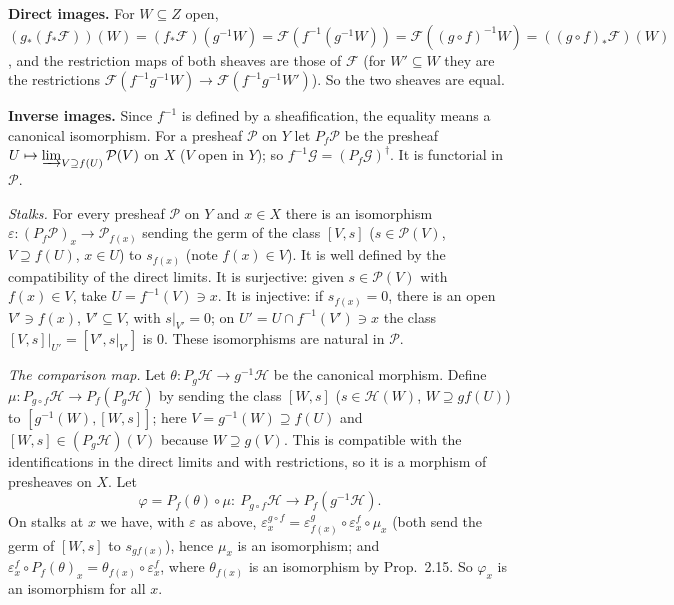 \documentclass[11pt]{article}
\begin{document}
\pf
\textbf{Direct images.} For $W\subseteq Z$ open, $(g_*(f_*\mathcal F))(W)=(f_*\mathcal F)(g^{-1}W)=\mathcal F(f^{-1}(g^{-1}W))=\mathcal F((g\circ f)^{-1}W)=((g\circ f)_*\mathcal F)(W)$, and the restriction maps of both sheaves are those of $\mathcal F$ (for $W'\subseteq W$ they are the restrictions $\mathcal F(f^{-1}g^{-1}W)\to\mathcal F(f^{-1}g^{-1}W')$). So the two sheaves are equal.

\textbf{Inverse images.} Since $f^{-1}$ is defined by a sheafification, the equality means a canonical isomorphism. For a presheaf $\mathcal P$ on $Y$ let $P_f\mathcal P$ be the presheaf $U\mapsto\varinjlim_{V\supseteq f(U)}\mathcal P(V)$ on $X$ ($V$ open in $Y$); so $f^{-1}\mathcal G=(P_f\mathcal G)^\dagger$. It is functorial in $\mathcal P$.

\emph{Stalks.} For every presheaf $\mathcal P$ on $Y$ and $x\in X$ there is an isomorphism $\varepsilon:(P_f\mathcal P)_x\to\mathcal P_{f(x)}$ sending the germ of the class $[V,s]$ ($s\in\mathcal P(V)$, $V\supseteq f(U)$, $x\in U$) to $s_{f(x)}$ (note $f(x)\in V$). It is well defined by the compatibility of the direct limits. It is surjective: given $s\in\mathcal P(V)$ with $f(x)\in V$, take $U=f^{-1}(V)\ni x$. It is injective: if $s_{f(x)}=0$, there is an open $V'\ni f(x)$, $V'\subseteq V$, with $s|_{V'}=0$; on $U'=U\cap f^{-1}(V')\ni x$ the class $[V,s]|_{U'}=[V',s|_{V'}]$ is $0$. These isomorphisms are natural in $\mathcal P$.

\emph{The comparison map.} Let $\theta:P_g\mathcal H\to g^{-1}\mathcal H$ be the canonical morphism. Define $\mu:P_{g\circ f}\mathcal H\to P_f(P_g\mathcal H)$ by sending the class $[W,s]$ ($s\in\mathcal H(W)$, $W\supseteq gf(U)$) to $[g^{-1}(W),[W,s]]$; here $V=g^{-1}(W)\supseteq f(U)$ and $[W,s]\in(P_g\mathcal H)(V)$ because $W\supseteq g(V)$. This is compatible with the identifications in the direct limits and with restrictions, so it is a morphism of presheaves on $X$. Let
\[ \varphi=P_f(\theta)\circ\mu:\ P_{g\circ f}\mathcal H\longrightarrow P_f(g^{-1}\mathcal H). \]
On stalks at $x$ we have, with $\varepsilon$ as above, $\varepsilon^{g\circ f}_x=\varepsilon^g_{f(x)}\circ\varepsilon^f_x\circ\mu_x$ (both send the germ of $[W,s]$ to $s_{gf(x)}$), hence $\mu_x$ is an isomorphism; and $\varepsilon^f_x\circ P_f(\theta)_x=\theta_{f(x)}\circ\varepsilon^f_x$, where $\theta_{f(x)}$ is an isomorphism by Prop.~2.15. So $\varphi_x$ is an isomorphism for all $x$.
\end{document}

